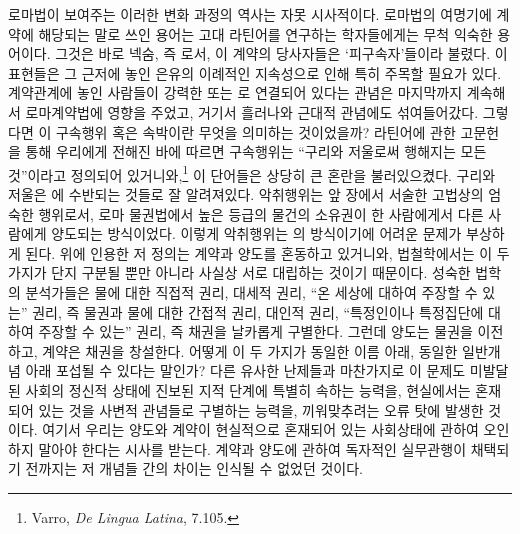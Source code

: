 로마법이 보여주는 이러한 변화 과정의 역사는 자못 시사적이다.
로마법의 여명기에
계약에 해당되는 말로 쓰인 용어는
고대 라틴어를 연구하는 학자들에게는 무척 익숙한 용어이다.
그것은 바로 넥숨, 즉 로서,
이 계약의 당사자들은 `피구속자'들이라 불렸다.
이 표현들은 그 근저에 놓인 은유의 이례적인 지속성으로 인해
특히 주목할 필요가 있다.
계약관계에 놓인 사람들이 강력한 
또는 로 연결되어 있다는
관념은 마지막까지 계속해서 로마계약법에 영향을 주었고,
거기서 흘러나와 근대적 관념에도 섞여들어갔다.
그렇다면 이 구속행위 혹은 속박이란 무엇을 의미하는 것이었을까?
라틴어에 관한 고문헌을 통해 우리에게 전해진 바에 따르면
구속행위는 ``구리와 저울로써 행해지는
모든 것''이라고
정의되어 있거니와,\footnote{%
  \latinmarks
  Varro, \textit{De Lingua Latina}, 7.105.
  }
이 단어들은 상당히 큰 혼란을 불러있으켰다.
구리와 저울은
에 수반되는 것들로 잘 알려져있다.
악취행위는
앞 장에서 서술한 고법상의 엄숙한 행위로서,
로마 물권법에서 높은 등급의 물건의 소유권이
한 사람에게서 다른 사람에게 양도되는 방식이었다.
이렇게 악취행위는 의 방식이기에
어려운 문제가 부상하게 된다.
위에 인용한 저 정의는
계약과 양도를 혼동하고 있거니와,
법철학에서는 이 두 가지가 단지 구분될 뿐만 아니라
사실상 서로 대립하는 것이기 때문이다.
성숙한 법학의 분석가들은
물에 대한 직접적 권리,
대세적 권리,
``온 세상에 대하여 주장할 수 있는'' 권리,
즉 물권과
물에 대한 간접적 권리,
대인적 권리,
``특정인이나 특정집단에 대하여 주장할 수 있는'' 권리,
즉 채권을
날카롭게 구별한다.
그런데 양도는 물권을 이전하고, 계약은 채권을 창설한다.
어떻게 이 두 가지가 동일한 이름 아래, 동일한 일반개념 아래
포섭될 수 있다는 말인가?
다른 유사한 난제들과 마찬가지로 이 문제도
미발달된 사회의 정신적 상태에
진보된 지적 단계에 특별히 속하는 능력을,
현실에서는 혼재되어 있는 것을 사변적 관념들로 구별하는 능력을,
끼워맞추려는
오류 탓에 발생한 것이다.
여기서
우리는
양도와 계약이 현실적으로 혼재되어 있는 사회상태에 관하여
오인하지 말아야 한다는 시사를 받는다.
계약과 양도에 관하여 독자적인 실무관행이 채택되기 전까지는
저 개념들 간의 차이는 인식될 수 없었던 것이다.

